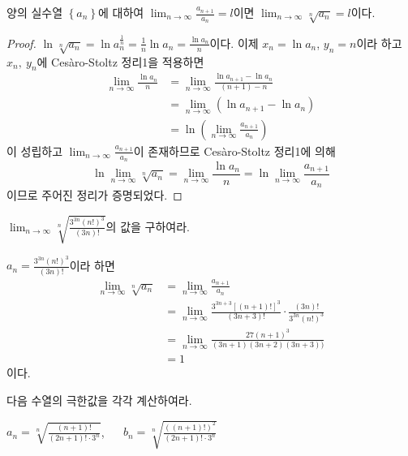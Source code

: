 \documentclass[11pt, a4paper]{book}
\begin{document}
\vspace{1em}
\begin{theorem}
양의 실수열 $\left\{a_{n}\right\}$에 대하여 $\displaystyle \lim_{n\to\infty}\frac{a_{n+1}}{a_{n}}=l$이면 $\displaystyle \lim_{n\to\infty}\sqrt[n]{a_{n}}=l$이다.
\end{theorem}
\begin{proof} $\ln\sqrt[n]{a_{n}}=\ln a_{n}^{\frac{1}{n}}=\frac{1}{n}\ln a_{n}=\frac{\ln a_{n}}{n}$이다. 이제 $x_{n}=\ln a_{n}$, $y_{n}=n$이라 하고 $x_{n},\: y_{n}$에 Ces\`{a}ro-Stoltz 정리1을 적용하면
\begin{align*}
	\lim_{n\to\infty}\frac{\ln a_{n}}{n}&=\lim_{n\to\infty}\frac{\ln a_{n+1}-\ln a_{n}}{(n+1)-n}\\
	&=\lim_{n\to\infty}\left(\ln a_{n+1}-\ln a_{n}\right)\\
	&=\ln\left(\lim_{n\to\infty}\frac{a_{n+1}}{a_{n}}\right)
\end{align*}
이 성립하고 $\displaystyle \lim_{n\to\infty}\frac{a_{n+1}}{a_{n}}$이 존재하므로 Ces\`{a}ro-Stoltz 정리1에 의해
\begin{equation*}
	\ln\lim_{n\to\infty}\sqrt[n]{a_{n}}=\lim_{n\to\infty}\frac{\ln a_{n}}{n}=\ln\lim_{n\to\infty}\frac{a_{n+1}}{a_{n}}
\end{equation*}
이므로 주어진 정리가 증명되었다.
\end{proof}
\vspace{1em}
\begin{example}
 $\displaystyle \lim_{n\to\infty}\sqrt[n]{\frac{3^{3n}(n!)^{3}}{(3n)!}}$의 값을 구하여라.
\begin{solution}
$a_{n}=\frac{3^{3n}(n!)^{3}}{(3n)!}$이라 하면
\begin{align*}
	\lim_{n\to\infty}\sqrt[n]{a_{n}}
	& =\lim_{n\to\infty}\frac{a_{n+1}}{a_{n}}\\
	& =\lim_{n\to\infty}\frac{3^{3n+3}[(n+1)!]^{3}}{(3n+3)!}\cdot\frac{(3n)!}{3^{3n}(n!)^{3}}\\
	& =\lim_{n\to\infty}\frac{27(n+1)^{3}}{(3n+1)(3n+2)(3n+3))}\\
	& = 1
\end{align*}
이다.
\end{solution}
\end{example}
\vspace{1em}
\begin{problem}
다음 수열의 극한값을 각각 계산하여라.

\phantom{문제 6.  }$a_{n}=\sqrt[n]{\frac{(n+1)!}{(2n+1)!\cdot 3^{n}}}$,  $\quad$ $b_{n}=\sqrt[n]{\frac{((n+1)!)^{2}}{(2n+1)!\cdot 3^{n}}}$
\end{problem}
\end{document}
